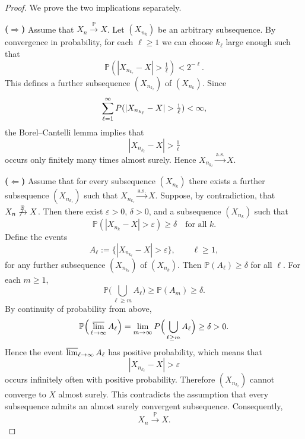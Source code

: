 \documentclass[12pt]{article}
\renewcommand{\(}{\left(}%
\renewcommand{\)}{\right)}%
\renewcommand{\[}{\left[}%
\renewcommand{\]}{\right]}%
\newtheorem{proof}{Proof.}}
\begin{document}
\begin{proof}
We prove the two implications separately.

\medskip
\noindent\textbf{($\Rightarrow$)}
Assume that $X_n \xrightarrow{\mathbb P} X$.
Let $(X_{n_k})$ be an arbitrary subsequence.
By convergence in probability, for each $\ell\ge1$ we can choose $k_\ell$ large enough such that
\begin{equation*}
\mathbb P(|X_{n_{k_\ell}}-X|>\tfrac{1}{\ell})
<2^{-\ell}.
\end{equation*}
This defines a further subsequence $(X_{n_{k_\ell}})$ of $(X_{n_k})$.
Since
\begin{equation*}
\sum_{\ell=1}^\infty 
\mathbb \mathbb P(|X_{n_{k_\ell}}-X|>\tfrac{1}{\ell})
<\infty,
\end{equation*}
the Borel--Cantelli lemma implies that
\begin{equation*}
|X_{n_{k_\ell}}-X|>\tfrac{1}{\ell}
\end{equation*}
occurs only finitely many times almost surely.
Hence $X_{n_{k_\ell}}\xrightarrow{\mathrm{a.s.}}X$.

\medskip
\noindent\textbf{($\Leftarrow$)}
Assume that for every subsequence $(X_{n_k})$ there exists a further subsequence
$(X_{n_{k_\ell}})$ such that $X_{n_{k_\ell}}\xrightarrow{\mathrm{a.s.}}X$.
Suppose, by contradiction, that $X_n\not\xrightarrow{\mathbb P}X$.
Then there exist $\varepsilon>0$, $\delta>0$, and a subsequence $(X_{n_k})$ such that
\begin{equation*}
\mathbb P(|X_{n_k}-X|>\varepsilon)\ge\delta
\quad\text{for all }k.
\end{equation*}
Define the events
\begin{equation*}
A_\ell:=\{|X_{n_{k_\ell}}-X|>\varepsilon\},
\qquad \ell\ge1,
\end{equation*}
for any further subsequence $(X_{n_{k_\ell}})$ of $(X_{n_k})$.
Then $\mathbb P(A_\ell)\ge\delta$ for all $\ell$.
For each $m\ge1$,
\begin{equation*}
\mathbb P\Big(\bigcup_{\ell\ge m} A_\ell\Big)
\ge \mathbb P(A_m)\ge\delta.
\end{equation*}
By continuity of probability from above,
\begin{equation*}
\mathbb P\Big(\varlimsup_{\ell\to\infty} A_\ell\Big)
=
\lim_{m\to\infty}
P\Big(\bigcup_{\ell\ge m} A_\ell\Big)
\ge\delta>0.
\end{equation*}
Hence the event $\varlimsup_{\ell\to\infty}A_\ell$ has positive probability, which means that
\begin{equation*}
|X_{n_{k_\ell}}-X|>\varepsilon
\end{equation*}
occurs infinitely often with positive probability.
Therefore $(X_{n_{k_\ell}})$ cannot converge to $X$ almost surely.
This contradicts the assumption that every subsequence admits an almost surely convergent
subsequence.
Consequently,
\begin{equation*}
X_n \xrightarrow{\mathbb P} X.
\end{equation*}
\end{proof}
\end{document}
